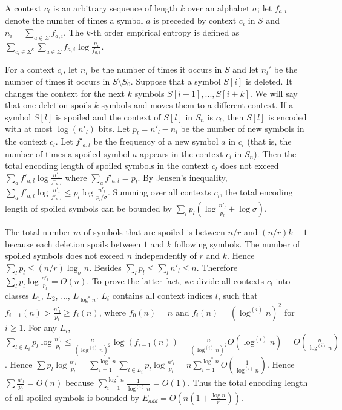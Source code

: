 \documentclass[11pt]{article}\usepackage{fullpage}
\begin{document}
A context  $c_i$ is an arbitrary sequence of length $k$ over an alphabet $\sigma$; let $f_{a,i}$ denote the number of times 
a symbol $a$ is preceded by context $c_i$ in $S$ and $n_i=\sum_{a\in\Sigma} f_{a,i}$. The $k$-th order empirical entropy is defined as $\sum_{c_i\in \Sigma^k}\sum_{a\in\Sigma} f_{a,i}\log\frac{n_i}{f_{a,i}}$.


For a context $c_l$, let $n_l$ be the number of times it occurs in $S$ and let $n_l'$ be the number of times it occurs in $S\setminus S_0$.
Suppose that a symbol $S[i]$ is deleted. It changes the context for the next $k$ symbols $S[i+1],..., S[i+k]$. We will say that one deletion spoils $k$ symbols and moves them to a different context. 
If a symbol $S[l]$ is spoiled and the context of $S[l]$ in $S_n$ is $c_l$, then 
$S[l]$ is encoded with at most $\log (n'_l)$ bits. 
Let $p_l=n'_l-n_l$ be the number of new symbols in the context $c_l$. Let $f'_{a,l}$ be the frequency of a new symbol $a$ in $c_l$ (that is, the number of times a spoiled symbol 
$a$ appears in the context $c_l$ in $S_n$). Then the total 
encoding length of spoiled symbols in the context $c_l$ does not exceed  $\sum_a f'_{a,l}\log\frac{n'_l}{f'_{a,l}}$ where 
$\sum_a f'_{a,l}=p_l$.
By Jensen's inequality, $\sum_a f'_{a,l}\log\frac{n'_l}{f'_{a,l}}\le p_l \log \frac{n'_l}{p_l/\sigma}$. Summing over all contexts $c_l$, the total encoding length of spoiled symbols can be bounded by $\sum_l p_l (\log \frac{n'_l}{p_l}+\log\sigma)$.
 


The total number $m$ of symbols that are spoiled is between $n/r$ and $(n/r)k-1$ because each deletion spoils between $1$ and $k$ following symbols. The number of spoiled symbols does not exceed $n$ independently of $r$ and $k$.
Hence $\sum_l p_l\le (n/r)\log_{\sigma}n$. Besides 
$\sum_l p_l\le \sum_l n'_l \le n$. 
Therefore $\sum_l p_l\log\frac{n'_l}{p_l}=O(n)$. To prove the latter fact, we divide all contexts $c_l$ into classes $L_1$, $L_2$, $\ldots$, $L_{\log^*n}$. 
$L_i$ contains all context indices $l$, such that $f_{i-1}(n)>\frac{n'_l}{p_l}\ge f_i(n)$, where $f_0(n)=n$ and $f_i(n)=(\log^{(i)}n)^2$ for $i\ge 1$.
For any $L_i$, $\sum_{l\in L_i}p_l\log\frac{n'_l}{p_l}\le \frac{n}{(\log^{(i)}n)^2}\log (f_{i-1}(n))=\frac{n}{(\log^{(i)}n)^2}O(\log^{(i)}n)=
O(\frac{n}{\log^{(i)}n})$. Hence $\sum p_l\log\frac{n'_l}{p_l}=\sum_{i=1}^{\log^*n}\sum_{l\in L_i}p_l\log\frac{n'_l}{p_l}= n\sum_{i=1}^{\log^*n}O(\frac{1}{\log^{(i)}n})$. Hence $\sum\frac{n'_l}{p_l}=O(n)$ because 
$\sum_{i=1}^{\log^*n}\frac{1}{\log^{(i)}n}=O(1)$.
Thus the total encoding length of all spoiled symbols is bounded by $E_{add}=O(n(1+\frac{\log n}{r}))$. 
\end{document}

